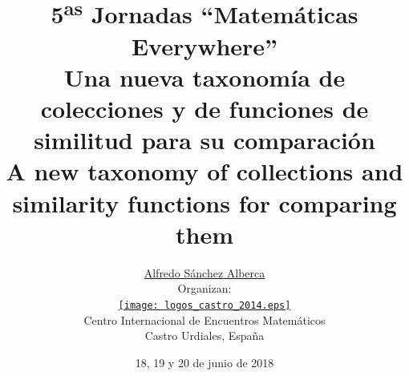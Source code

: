\documentclass[a4paper,10pt,twoside]{article}
\theoremstyle{definition}
\begin{document}
\renewcommand{\tablename}{Tabla} 

\title{\vspace{-8mm}5\textsuperscript{as} Jornadas ``Matemáticas Everywhere''\\\vspace{4mm}
Una nueva taxonomía de colecciones y de funciones de similitud para su comparación\\\vspace{4mm}
A new taxonomy of collections and similarity functions for comparing them\vspace{-3mm}}  %
\author{\href{mailto:asalber@ceu.es}{Alfredo Sánchez Alberca}\\ \vspace{2mm} %
\scriptsize Organizan:\\
\small \href{http://www.caminos.upm.es/matematicas/jornadas2014/}{\texttt{[image: logos\_castro\_2014.eps]}}\\
\scriptsize Centro Internacional de Encuentros Matemáticos\vspace{-2mm}\\ 
\scriptsize Castro Urdiales, España} %
\date{18, 19 y 20 de junio de 2018}
\maketitle
\end{document}
